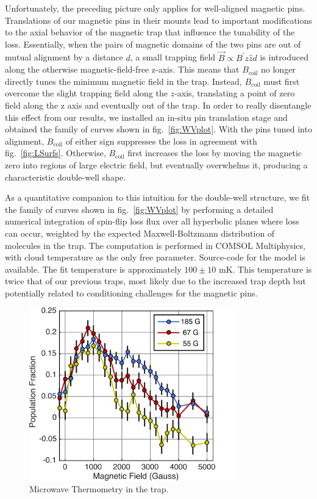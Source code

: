 \documentclass[%
 reprint,
 amsmath,amssymb,
 aps,
prl,
]{revtex4-1}
\begin{document}
Unfortunately, the preceding picture only applies for well-aligned magnetic pins. Translations of our magnetic pins in their mounts lead to important modifications to the axial behavior of the magnetic trap that influence the tunability of the loss. Essentially, when the pairs of magnetic domains of the two pins are out of mutual alignment by a distance $d$, a small trapping field $\vec{B}\propto B^\prime z\hat{z} d$ is introduced along the otherwise magnetic-field-free z-axis. This means that $B_\text{coil}$ no longer directly tunes the minimum magnetic field in the trap. Instead, $B_\text{coil}$ must first overcome the slight trapping field along the $z$-axis, translating a point of zero field along the z axis and eventually out of the trap. In order to really disentangle this effect from our results, we installed an in-situ pin translation stage and obtained the family of curves shown in fig.~\ref{fig:WVplot}. With the pins tuned into alignment, $B_\text{coil}$ of either sign suppresses the loss in agreement with fig.~\ref{fig:LSurfs}. Otherwise, $B_\text{coil}$ first increases the loss by moving the magnetic zero into regions of large electric field, but eventually overwhelms it, producing a characteristic double-well shape. 

As a quantitative companion to this intuition for the double-well structure, we fit the family of curves shown in fig.~\ref{fig:WVplot} by performing a detailed numerical integration of spin-flip loss flux over all hyperbolic planes where loss can occur, weighted by the expected Maxwell-Boltzmann distribution of molecules in the trap. The computation is performed in COMSOL Multiphysics, with cloud temperature as the only free parameter. Source-code for the model is available.\cite{githubCOMcode} The fit temperature is approximately $100\pm10\text{ mK}$. This temperature is twice that of our previous traps, most likely due to the increased trap depth but potentially related to conditioning challenges for the magnetic pins.

\begin{figure}
\includegraphics[width=90mm]{MWSpec/MW-therm-dave.png}%
\caption{
Microwave Thermometry in the trap.
\label{fig:spec}}
\end{figure}
\end{document}
